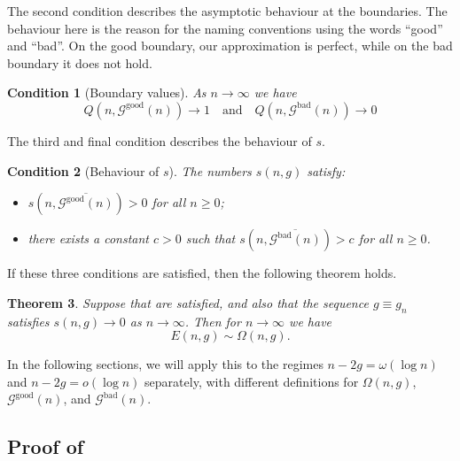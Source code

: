 \documentclass[a4paper,12pt]{article}
\newtheorem{theorem}{Theorem}
\newtheorem{condition}[theorem]{Condition}
\theoremstyle{definition}
\newcommand{\E}{E}
\newcommand{\nto}{\ensuremath{n\rightarrow\infty}}
\newcommand{\good}[1]{\mathcal{G}^{\text{good}}({#1})}
\newcommand{\goodG}{\good{n}}
\newcommand{\goodGG}{\overline{\goodG}}
\newcommand{\bad}[1]{\mathcal{G}^{\text{bad}}({#1})}
\newcommand{\badG}{\bad{n}}
\newcommand{\badGG}{\overline{\badG}}
\begin{document}
The second condition describes the asymptotic behaviour at the boundaries. 
The behaviour here is the reason for the naming conventions using the words ``good'' and ``bad''. 
On the good boundary, our approximation is perfect, while on the bad boundary it does not hold. 
\begin{condition}[Boundary values]\label{assum_bd_values}
    As $\nto$  we have
    \[Q(n,\goodG)\to 1 \quad \text{and}\quad Q(n,\badG)\to 0\]
\end{condition}

The third and final condition describes the behaviour of $s$. 
\begin{condition}[Behaviour of $s$]\label{assum_behavior_s}
The numbers $s(n,g)$ satisfy:
\begin{itemize}
    \item $s(n,\goodGG)>0$ for all $n\geq 0$;
    \item there exists a constant $c>0$ such that $s(n,\badGG)>c$ for all $n\geq 0$.
\end{itemize}
\end{condition}



If these three conditions are satisfied, then the following theorem holds. 
\begin{theorem}\label{thm_RW_to_asympto}
Suppose that  are satisfied, and also that the sequence $g\equiv g_n$ satisfies $s(n,g)\to 0$ as $\nto$. Then for $\nto$ we have
\[\E(n,g)\sim\Omega(n,g).\]
\end{theorem}

In the following sections, we will apply this to the regimes $n-2g=\omega(\log n)$ and $n-2g=o(\log n)$ separately, with different definitions for $\Omega(n,g)$, $\goodG$, and $\badG$.

\subsection{Proof of }
\end{document}
